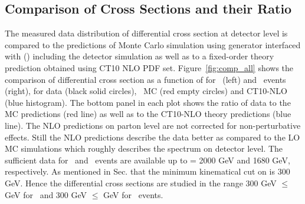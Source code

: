 \subsection{Comparison of Cross Sections and their Ratio}
The measured data distribution of differential cross section at detector level is compared to the predictions of Monte Carlo simulation using \MadGraphF generator interfaced with \PYTHIAS (\MGP) including the detector simulation as well as to a fixed-order theory prediction obtained using CT10 NLO PDF set. Figure~\ref{fig:comp_all} shows the comparison of differential cross section as a function of \httwo for \njt~(left) and \njth~events (right), for data (black solid circles), \MGP~MC (red empty circles) and CT10-NLO (blue histogram). The bottom panel in each plot shows the ratio of data to the MC predictions (red line) as well as to the CT10-NLO theory predictions (blue line). The NLO predictions on parton level are not corrected for non-perturbative effects. Still the NLO predictions describe the data better as compared to the LO MC simulations which roughly describes the spectrum on detector level. The sufficient data for \njt~and \njth~events are available up to \httwo = 2000 GeV and 1680 GeV, respectively. As mentioned in Sec. \qm that the minimum kinematical cut on \httwo is 300 GeV. Hence the differential cross sections are studied in the range 300 GeV $\leq$ \httwo {} GeV for \njt~and 300 GeV $\leq$ \httwo {} GeV for \njth~events.

